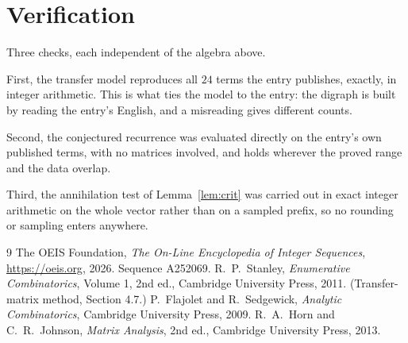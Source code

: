 \documentclass[11pt,a4paper]{article}
\theoremstyle{plain}
\theoremstyle{definition}
\begin{document}
\section{Verification}

Three checks, each independent of the algebra above.

First, the transfer model reproduces all $24$ terms the entry publishes, exactly, in
integer arithmetic. This is what ties the model to the entry: the digraph is built by reading
the entry's English, and a misreading gives different counts.

Second, the conjectured recurrence was evaluated directly on the entry's own published terms,
with no matrices involved, and holds wherever the proved range and the data overlap.

Third, the annihilation test of Lemma~\ref{lem:crit} was carried out in exact integer
arithmetic on the whole vector rather than on a sampled prefix, so no rounding or sampling
enters anywhere.

\begin{thebibliography}{9}
 The OEIS Foundation, \emph{The On-Line Encyclopedia of Integer
Sequences}, \url{https://oeis.org}, 2026. Sequence A252069.
 R.~P.~Stanley, \emph{Enumerative Combinatorics}, Volume 1, 2nd ed.,
Cambridge University Press, 2011. (Transfer-matrix method, Section 4.7.)
 P.~Flajolet and R.~Sedgewick, \emph{Analytic Combinatorics}, Cambridge
University Press, 2009.
 R.~A.~Horn and C.~R.~Johnson, \emph{Matrix Analysis}, 2nd ed., Cambridge
University Press, 2013.
\end{thebibliography}
\end{document}
